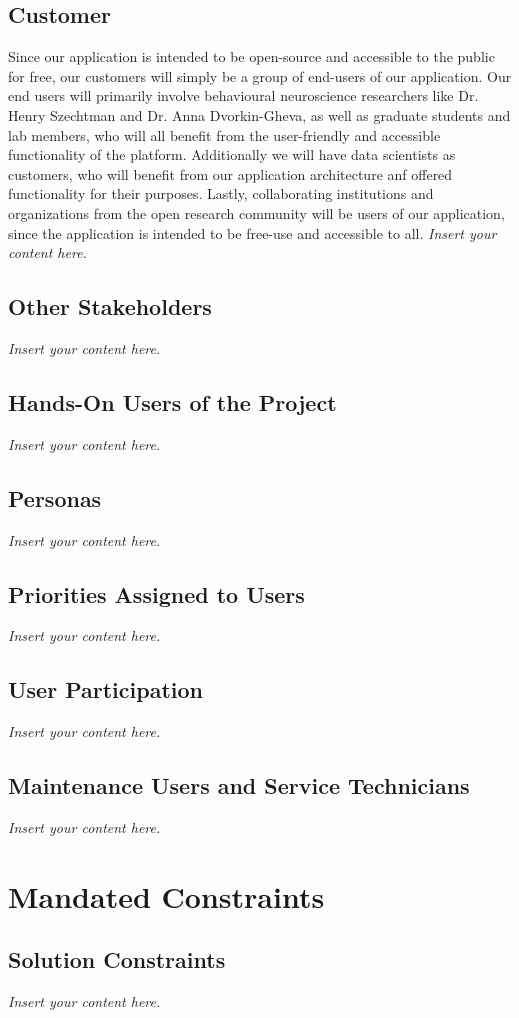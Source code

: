 \documentclass[12pt]{article}
\newcommand{\lips}{\textit{Insert your content here.}}
\begin{document}
\subsection{Customer}

\par{Since our application is intended to be open-source and accessible to the public for free, our customers will simply be a group of end-users
of our application. Our end users will primarily involve behavioural neuroscience researchers like Dr. Henry Szechtman and Dr. Anna Dvorkin-Gheva, 
as well as graduate students and lab members, who will all benefit from the user-friendly and accessible functionality of the platform. 
Additionally we will have data scientists as customers, who will benefit from our application architecture anf offered functionality for 
their purposes. Lastly, collaborating institutions and organizations from the open research community will be users of our application, 
since the application is intended to be free-use and accessible to all.}
\lips
\subsection{Other Stakeholders}
\lips
\subsection{Hands-On Users of the Project}
\lips
\subsection{Personas}
\lips
\subsection{Priorities Assigned to Users}
\lips
\subsection{User Participation}
\lips
\subsection{Maintenance Users and Service Technicians}
\lips

\section{Mandated Constraints}
\subsection{Solution Constraints}
\lips
\end{document}
